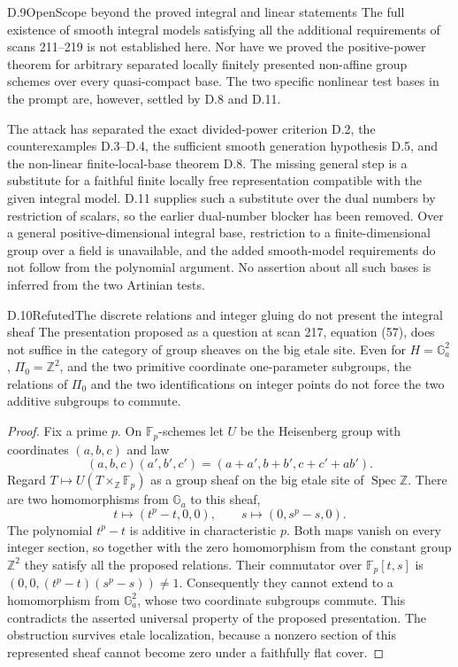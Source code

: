 \begin{statement}{D.9}{Open}{Scope beyond the proved integral and linear statements}
The full existence of smooth integral models satisfying all the
additional requirements of scans 211--219 is not established here.
Nor have we proved the positive-power theorem for arbitrary separated
locally finitely presented non-affine group schemes over every
quasi-compact base. The two specific nonlinear test bases in the
prompt are, however, settled by D.8 and D.11.
\end{statement}
\noindent
The attack has separated the exact divided-power criterion D.2,
the counterexamples D.3--D.4, the sufficient smooth generation
hypothesis D.5, and the non-linear finite-local-base theorem D.8.
The missing general step is a substitute for a faithful finite
locally free representation compatible with the given integral
model. D.11 supplies such a substitute over the dual numbers by
restriction of scalars, so the earlier dual-number blocker has
been removed. Over a general positive-dimensional integral base,
restriction to a finite-dimensional group over a field is
unavailable, and the added smooth-model requirements do not follow
from the polynomial argument. No assertion about all such bases
is inferred from the two Artinian tests.

\begin{statement}{D.10}{Refuted}{The discrete relations and integer gluing do not present the integral sheaf}
The presentation proposed as a question at scan 217, equation (57),
does not suffice in the category of group sheaves on the big etale
site.  Even for $H=\mathbb G_a^2$, $\Pi_0=\mathbb Z^2$, and the
two primitive coordinate one-parameter subgroups, the relations
of $\Pi_0$ and the two identifications on integer points do not
force the two additive subgroups to commute.
\end{statement}
\begin{proof}
Fix a prime $p$.  On $\mathbb F_p$-schemes let $U$ be the Heisenberg
group with coordinates $(a,b,c)$ and law
\[
 (a,b,c)(a',b',c')=(a+a',b+b',c+c'+ab').
\]
Regard $T\mapsto U(T\times_{\mathbb Z}\mathbb F_p)$ as a group
sheaf on the big etale site of $\operatorname{Spec}\mathbb Z$.
There are two homomorphisms from $\mathbb G_a$ to this sheaf,
\[
 t\longmapsto(t^p-t,0,0),\qquad
 s\longmapsto(0,s^p-s,0).
\]
The polynomial $t^p-t$ is additive in characteristic $p$.  Both
maps vanish on every integer section, so together with the zero
homomorphism from the constant group $\mathbb Z^2$ they satisfy
all the proposed relations.  Their commutator over
$\mathbb F_p[t,s]$ is $(0,0,(t^p-t)(s^p-s))\ne1$.
Consequently they cannot extend to a homomorphism from
$\mathbb G_a^2$, whose two coordinate subgroups commute.  This
contradicts the asserted universal property of the proposed
presentation.  The obstruction survives etale localization,
because a nonzero section of this represented sheaf cannot
become zero under a faithfully flat cover.
\end{proof}

